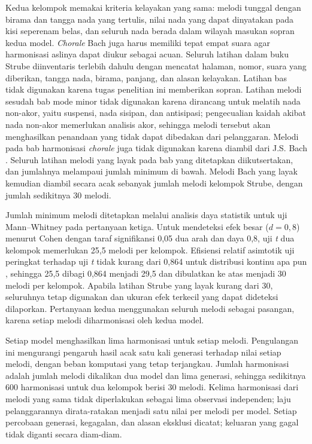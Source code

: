 Kedua kelompok memakai kriteria kelayakan yang sama: melodi tunggal dengan birama dan tangga nada yang tertulis, nilai nada yang dapat dinyatakan pada kisi seperenam belas, dan seluruh nada berada dalam wilayah masukan sopran kedua model. \textit{Chorale} Bach juga harus memiliki tepat empat suara agar harmonisasi aslinya dapat diukur sebagai acuan. Seluruh latihan dalam buku Strube diinventaris terlebih dahulu dengan mencatat halaman, nomor, suara yang diberikan, tangga nada, birama, panjang, dan alasan kelayakan. Latihan bas tidak digunakan karena tugas penelitian ini memberikan sopran. Latihan melodi sesudah bab mode minor tidak digunakan karena dirancang untuk melatih nada non-akor, yaitu suspensi, nada sisipan, dan antisipasi; pengecualian kaidah akibat nada non-akor memerlukan analisis akor, sehingga melodi tersebut akan menghasilkan penandaan yang tidak dapat dibedakan dari pelanggaran. Melodi pada bab harmonisasi \textit{chorale} juga tidak digunakan karena diambil dari J.S. Bach \parencite[174]{strube1928}. Seluruh latihan melodi yang layak pada bab yang ditetapkan diikutsertakan, dan jumlahnya melampaui jumlah minimum di bawah. Melodi Bach yang layak kemudian diambil secara acak sebanyak jumlah melodi kelompok Strube, dengan jumlah sedikitnya 30 melodi.

Jumlah minimum melodi ditetapkan melalui analisis daya statistik untuk uji Mann--Whitney pada pertanyaan ketiga. Untuk mendeteksi efek besar ($d = 0{,}8$) menurut Cohen \parencite{cohen1988} dengan taraf signifikansi 0,05 dua arah dan daya 0,8, uji \textit{t} dua kelompok memerlukan 25,5 melodi per kelompok. Efisiensi relatif asimtotik uji peringkat terhadap uji \textit{t} tidak kurang dari 0,864 untuk distribusi kontinu apa pun \parencite{hodges1956}, sehingga 25,5 dibagi 0,864 menjadi 29,5 dan dibulatkan ke atas menjadi 30 melodi per kelompok. Apabila latihan Strube yang layak kurang dari 30, seluruhnya tetap digunakan dan ukuran efek terkecil yang dapat dideteksi dilaporkan. Pertanyaan kedua menggunakan seluruh melodi sebagai pasangan, karena setiap melodi diharmonisasi oleh kedua model.

Setiap model menghasilkan lima harmonisasi untuk setiap melodi. Pengulangan ini mengurangi pengaruh hasil acak satu kali generasi terhadap nilai setiap melodi, dengan beban komputasi yang tetap terjangkau. Jumlah harmonisasi adalah jumlah melodi dikalikan dua model dan lima generasi, sehingga sedikitnya 600 harmonisasi untuk dua kelompok berisi 30 melodi. Kelima harmonisasi dari melodi yang sama tidak diperlakukan sebagai lima observasi independen; laju pelanggarannya dirata-ratakan menjadi satu nilai per melodi per model. Setiap percobaan generasi, kegagalan, dan alasan eksklusi dicatat; keluaran yang gagal tidak diganti secara diam-diam.

